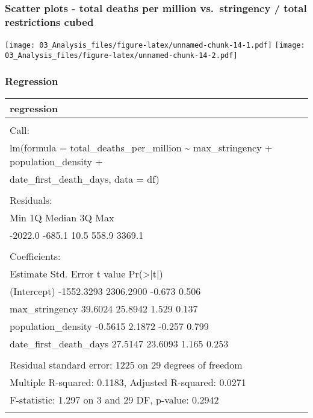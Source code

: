 \documentclass[
]{article}
\begin{document}
\hypertarget{scatter-plots---total-deaths-per-million-vs.-stringency-total-restrictions-cubed}{%
\subsubsection{Scatter plots - total deaths per million vs.~stringency /
total restrictions
cubed}\label{scatter-plots---total-deaths-per-million-vs.-stringency-total-restrictions-cubed}}

\texttt{[image: 03\_Analysis\_files/figure-latex/unnamed-chunk-14-1.pdf]}
\texttt{[image: 03\_Analysis\_files/figure-latex/unnamed-chunk-14-2.pdf]}

\hypertarget{regression-2}{%
\subsubsection{Regression}\label{regression-2}}

\begin{table}
\centering
\begin{tabular}[t]{l}
\hline
regression\\
\hline
\\
\hline
Call:\\
\hline
lm(formula = total\_deaths\_per\_million \textasciitilde{} max\_stringency + population\_density +\\
\hline
date\_first\_death\_days, data = df)\\
\hline
\\
\hline
Residuals:\\
\hline
Min      1Q  Median      3Q     Max\\
\hline
-2022.0  -685.1    10.5   558.9  3369.1\\
\hline
\\
\hline
Coefficients:\\
\hline
Estimate Std. Error t value Pr(>|t|)\\
\hline
(Intercept)           -1552.3293  2306.2900  -0.673    0.506\\
\hline
max\_stringency           39.6024    25.8942   1.529    0.137\\
\hline
population\_density       -0.5615     2.1872  -0.257    0.799\\
\hline
date\_first\_death\_days    27.5147    23.6093   1.165    0.253\\
\hline
\\
\hline
Residual standard error: 1225 on 29 degrees of freedom\\
\hline
Multiple R-squared:  0.1183,    Adjusted R-squared:  0.0271\\
\hline
F-statistic: 1.297 on 3 and 29 DF,  p-value: 0.2942\\
\hline
\\
\hline
\end{tabular}
\end{table}
\end{document}
